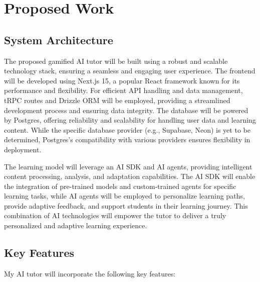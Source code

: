\documentclass[
	letterpaper, %
]{jdf}
\begin{document}
\section{Proposed Work}

\subsection{System Architecture}
The proposed gamified AI tutor will be built using a robust and scalable technology stack, ensuring a seamless and engaging user experience. The frontend will be developed using Next.js 15, a popular React framework known for its performance and flexibility. For efficient API handling and data management, tRPC routes and Drizzle ORM will be employed, providing a streamlined development process and ensuring data integrity. The database will be powered by Postgres, offering reliability and scalability for handling user data and learning content. While the specific database provider (e.g., Supabase, Neon) is yet to be determined, Postgres's compatibility with various providers ensures flexibility in deployment.

The learning model will leverage an AI SDK and AI agents, providing intelligent content processing, analysis, and adaptation capabilities. The AI SDK will enable the integration of pre-trained models and custom-trained agents for specific learning tasks, while AI agents will be employed to personalize learning paths, provide adaptive feedback, and support students in their learning journey. This combination of AI technologies will empower the tutor to deliver a truly personalized and adaptive learning experience.

\subsection{Key Features}

My AI tutor will incorporate the following key features:
\end{document}
